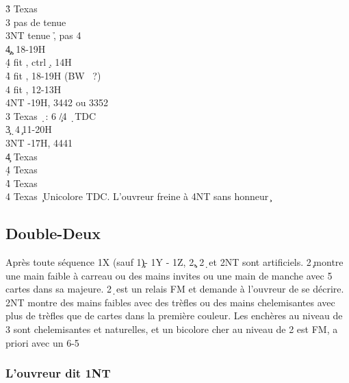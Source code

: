 \documentclass[a4paper]{article}
\begin{document}
\begin{bidtable}
3\h \> Texas \s \+\\
3\s \> pas de tenue \h \\
3NT \> tenue \h , pas 4\s \\
4\c {}\c , 18-19H\\
4\d \> fit \s , ctrl \d , 14H\\
4\h \> fit \s , 18-19H (BW \s\ ?)\\
4\s \> fit \s , 12-13H\\
4NT -19H, 3442 ou 3352\-\\
3\s \> Texas \d\ : 6 \c /4 \d\ TDC\-\\
3\c {}\d\ 4\c\ 11-20H\\
3NT -17H, 4441\+\\
4\c \> Texas \d \\
4\d \> Texas \h \\
4\h \> Texas \s \\
4\s \> Texas \c\ Unicolore TDC. L'ouvreur freine à 4NT sans honneur \c \-
\end{bidtable}

\subsection{Double-Deux}

Après toute séquence 1X (sauf 1\c )- 1Y - 1Z, 2\c , 2\d\ et 2NT sont artificiels. 2\c\ montre
une main faible à carreau ou des mains invites ou une main de manche avec 5 cartes
dans sa majeure. 2\d\ est un relais FM et demande à l'ouvreur de se décrire.
2NT montre des mains faibles avec des trèfles ou des mains chelemisantes avec plus de
trèfles que de cartes dans la première couleur.
Les enchères au niveau de 3 sont chelemisantes et naturelles, et un bicolore cher
au niveau de 2 est FM, a priori avec un 6-5

\subsubsection{L'ouvreur dit 1NT}
\end{document}
